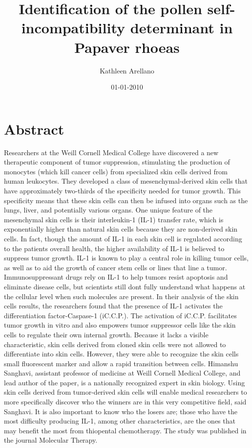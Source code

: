 \documentclass{article}%
\title{Identification of the pollen self{-}incompatibility determinant in Papaver rhoeas}%
\author{Kathleen Arellano}%
\affil{Department of Bioengineering, University of California, Berkeley, California 94720, USA}%
\date{01{-}01{-}2010}%
\begin{document}
%
\normalsize%
\maketitle%
\section{Abstract}%
\label{sec:Abstract}%
Researchers at the Weill Cornell Medical College have discovered a new therapeutic component of tumor suppression, stimulating the production of monocytes (which kill cancer cells) from specialized skin cells derived from human leukocytes.\newline%
They developed a class of mesenchymal{-}derived skin cells that have approximately two{-}thirds of the specificity needed for tumor growth. This specificity means that these skin cells can then be infused into organs such as the lungs, liver, and potentially various organs.\newline%
One unique feature of the mesenchymal skin cells is their interleukin{-}1 (IL{-}1) transfer rate, which is exponentially higher than natural skin cells because they are non{-}derived skin cells. In fact, though the amount of IL{-}1 in each skin cell is regulated according to the patients overall health, the higher availability of IL{-}1 is believed to suppress tumor growth.\newline%
IL{-}1 is known to play a central role in killing tumor cells, as well as to aid the growth of cancer stem cells or lines that line a tumor. Immunosuppressant drugs rely on IL{-}1 to help tumors resist apoptosis and eliminate disease cells, but scientists still dont fully understand what happens at the cellular level when such molecules are present.\newline%
In their analysis of the skin cells results, the researchers found that the presence of IL{-}1 activates the differentiation factor{-}Caspase{-}1 (iC.C.P.). The activation of iC.C.P. facilitates tumor growth in vitro and also empowers tumor suppressor cells like the skin cells to regulate their own internal growth.\newline%
Because it lacks a visible characteristic, skin cells derived from cloned skin cells were not allowed to differentiate into skin cells. However, they were able to recognize the skin cells small fluorescent marker and allow a rapid transition between cells.\newline%
Himanshu Sanghavi, assistant professor of medicine at Weill Cornell Medical College, and lead author of the paper, is a nationally recognized expert in skin biology.\newline%
Using skin cells derived from tumor{-}derived skin cells will enable medical researchers to more specifically discover who the winners are in this very competitive field, said Sanghavi. It is also important to know who the losers are; those who have the most difficulty producing IL{-}1, among other characteristics, are the ones that may benefit the most from thiopental chemotherapy.\newline%
The study was published in the journal Molecular Therapy.
\end{document}
